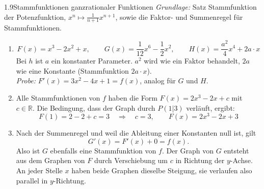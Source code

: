 
\begin{loesung}{1.9}{Stammfunktionen ganzrationaler Funktionen}
\textit{Grundlage:} Satz \glqq Stammfunktion der Potenzfunktion\grqq{}, $x^n \mapsto \frac{1}{n+1}x^{n+1}$, sowie die Faktor- und Summenregel für Stammfunktionen.
\begin{enumerate}[label=\alph*)]
  \item \[F(x) = x^3-2x^2+x,\qquad G(x) = \dfrac{1}{12}x^6-\dfrac{1}{2}x^2,\qquad H(x) = \dfrac{a^2}{4}x^4+2a\cdot x\]
  Bei $h$ ist $a$ ein konstanter Parameter. $a^2$ wird wie ein Faktor behandelt, $2a$ wie eine Konstante (Stammfunktion $2a\cdot x$).\\
  \textit{Probe:} $F'(x) = 3x^2-4x+1 = f(x)$, analog für $G$ und $H$.
  \item Alle Stammfunktionen von $f$ haben die Form $F(x) = 2x^3-2x+c$ mit $c\in\mathds{R}$. Die Bedingung, dass der Graph durch $P(1|3)$ verläuft, ergibt:
  \[F(1) = 2-2+c = 3 \quad\Longrightarrow\quad c = 3,\qquad F(x) = 2x^3-2x+3\]
  \item Nach der Summenregel und weil die Ableitung einer Konstanten null ist, gilt
  \[G'(x) = F'(x)+0 = f(x).\]
  Also ist $G$ ebenfalls eine Stammfunktion von $f$. Der Graph von $G$ entsteht aus dem Graphen von $F$ durch Verschiebung um $c$ in Richtung der $y$-Achse. An jeder Stelle $x$ haben beide Graphen dieselbe Steigung, sie verlaufen also \glqq parallel\grqq{} in $y$-Richtung.
\end{enumerate}
\end{loesung}



